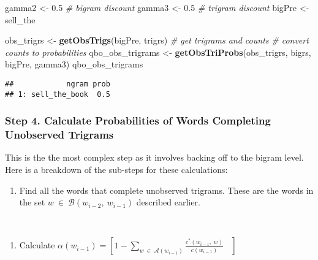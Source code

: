 \documentclass[
]{article}
\newenvironment{Shaded}{\begin{snugshade}}{\end{snugshade}}
\newcommand{\CommentTok}[1]{\textcolor[rgb]{0.56,0.35,0.01}{\textit{#1}}}
\newcommand{\FloatTok}[1]{\textcolor[rgb]{0.00,0.00,0.81}{#1}}
\newcommand{\KeywordTok}[1]{\textcolor[rgb]{0.13,0.29,0.53}{\textbf{#1}}}
\newcommand{\NormalTok}[1]{#1}
\newcommand{\StringTok}[1]{\textcolor[rgb]{0.31,0.60,0.02}{#1}}
\providecommand{\tightlist}{%
  \setlength{\itemsep}{0pt}\setlength{\parskip}{0pt}}
\begin{document}
\begin{Shaded}
\begin{Highlighting}[]
\NormalTok{gamma2 \textless{}{-}}\StringTok{ }\FloatTok{0.5}  \CommentTok{\# bigram discount}
\NormalTok{gamma3 \textless{}{-}}\StringTok{ }\FloatTok{0.5}  \CommentTok{\# trigram discount}
\NormalTok{bigPre \textless{}{-}}\StringTok{ \textquotesingle{}sell\_the\textquotesingle{}}

\NormalTok{obs\_trigrs \textless{}{-}}\StringTok{ }\KeywordTok{getObsTrigs}\NormalTok{(bigPre, trigrs)  }\CommentTok{\# get trigrams and counts}
\CommentTok{\# convert counts to probabilities}
\NormalTok{qbo\_obs\_trigrams \textless{}{-}}\StringTok{ }\KeywordTok{getObsTriProbs}\NormalTok{(obs\_trigrs, bigrs, bigPre, gamma3)}
\NormalTok{qbo\_obs\_trigrams}
\end{Highlighting}
\end{Shaded}

\begin{verbatim}
##            ngram prob
## 1: sell_the_book  0.5
\end{verbatim}

\hypertarget{step-4.-calculate-probabilities-of-words-completing-unobserved-trigrams}{%
\subsubsection{Step 4. Calculate Probabilities of Words Completing
Unobserved
Trigrams}\label{step-4.-calculate-probabilities-of-words-completing-unobserved-trigrams}}

This is the the most complex step as it involves backing off to the
bigram level. Here is a breakdown of the sub-steps for these
calculations:

\begin{enumerate}
\def\labelenumi{\roman{enumi}.}
\tightlist
\item
  Find all the words that complete unobserved trigrams. These are the
  words in the set \(w\:\in\:\mathcal{B}(w_{i-2},\:w_{i-1})\) described
  earlier. ~
\end{enumerate}

~

\begin{enumerate}
\def\labelenumi{\roman{enumi}.}
\setcounter{enumi}{1}
\tightlist
\item
  Calculate
  \(\alpha(w_{i-1}) = \left[1 - \sum\limits_{w\:\in\:\mathcal{A}(w_{i-1})} \frac{c^*(w_{i-1},\:w)}{c(w_{i-1})}\:\:\:\:\right]\)
  ~
\end{enumerate}
\end{document}
